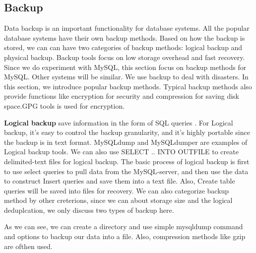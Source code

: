 \subsection{Backup}

Data backup is an important functionality for database systems. All the popular database systems have their own backup methods. Based on how the backup is stored, we can can have two categories of backup methods: logical backup and physical backup. Backup tools focus on low storage overhead and fast recovery. Since we do experiment with MySQL, this section focus on backup methods for MySQL. Other systems will be similar. We use backup to deal with disasters. In this section, we introduce popular backup methods. Typical backup methods also provide functions like encryption for security and compression for saving disk space.GPG tools is used for encryption.


\textbf{Logical backup} save information in the form of SQL queries \citep{mysqlbackupdocumentatio}. For Logical backup, it's easy to control the backup granularity, and it's highly portable since the backup is in text format. MySQLdump and MySQLdumper\citep{mysqldumpper} are examples of Logical backup tools. We can also use SELECT .. INTO OUTFILE to create delimited-text files for logical backup. The basic process of logical backup is first to use select queries to pull data from the MySQL-server, and then use the data to construct Insert queries and save them into a text file. Also, Create table queries will be saved into files for recovery. We can also categorize backup method by other creterions, since we can about storage size and the logical deduplcation, we only discuss two types of backup here.






                                                 

As we can see, we can create a directory and use simple mysqldump command and options to backup our data into a file. Also, compression methods like gzip are ofthen used.


